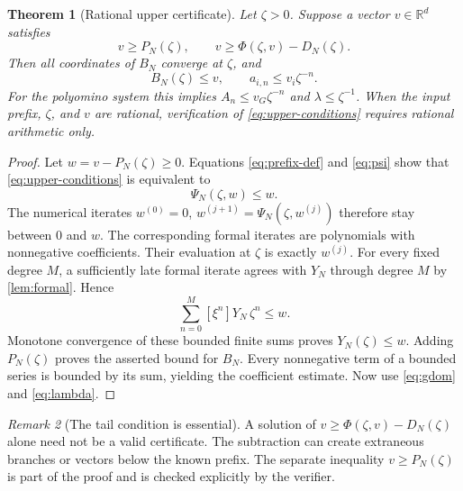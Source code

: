 \documentclass[11pt,a4paper]{article}
\newtheorem{theorem}{Theorem}[section]
\theoremstyle{definition}
\theoremstyle{remark}
\newtheorem{remark}[theorem]{Remark}
\newcommand{\R}{\mathbb R}
\begin{document}
\begin{theorem}[Rational upper certificate]\label{thm:upper}
Let $\zeta>0$. Suppose a vector $v\in\R^d$ satisfies
\begin{equation}\label{eq:upper-conditions}
 v\geq P_N(\zeta),\qquad
 v\geq\Phi(\zeta,v)-D_N(\zeta).
\end{equation}
Then all coordinates of $B_N$ converge at $\zeta$, and
\[
 B_N(\zeta)\leq v,\qquad
 a_{i,n}\leq v_i\zeta^{-n}.
\]
For the polyomino system this implies
$A_n\leq v_G\zeta^{-n}$ and $\lambda\leq\zeta^{-1}$.
When the input prefix, $\zeta$, and $v$ are rational, verification of
\eqref{eq:upper-conditions} requires rational arithmetic only.
\end{theorem}
\begin{proof}
Let $w=v-P_N(\zeta)\geq0$. Equations \eqref{eq:prefix-def} and
\eqref{eq:psi} show that \eqref{eq:upper-conditions} is equivalent to
\[
 \Psi_N(\zeta,w)\leq w.
\]
The numerical iterates $w^{(0)}=0$,
$w^{(j+1)}=\Psi_N(\zeta,w^{(j)})$ therefore stay between $0$ and $w$.
The corresponding formal iterates are polynomials with nonnegative
coefficients. Their evaluation at $\zeta$ is exactly $w^{(j)}$.
For every fixed degree $M$, a sufficiently late formal iterate agrees with
$Y_N$ through degree $M$ by \cref{lem:formal}. Hence
\[
 \sum_{n=0}^M[\xi^n]Y_N\,\zeta^n\leq w.
\]
Monotone convergence of these bounded finite sums proves
$Y_N(\zeta)\leq w$. Adding $P_N(\zeta)$ proves the asserted bound for $B_N$.
Every nonnegative term of a bounded series is bounded by its sum, yielding
the coefficient estimate. Now use \eqref{eq:gdom} and \eqref{eq:lambda}.
\end{proof}

\begin{remark}[The tail condition is essential]
A solution of $v\geq\Phi(\zeta,v)-D_N(\zeta)$ alone need not be a valid
certificate. The subtraction can create extraneous branches or vectors below
the known prefix. The separate inequality $v\geq P_N(\zeta)$ is part of the
proof and is checked explicitly by the verifier.
\end{remark}
\end{document}
